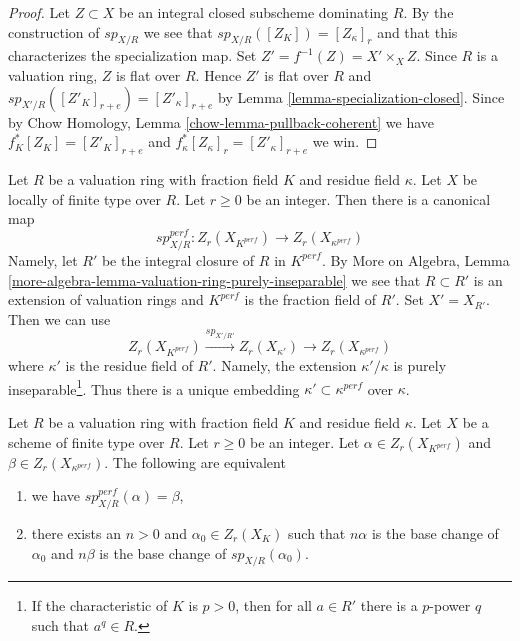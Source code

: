 \begin{proof}
Let $Z \subset X$ be an integral closed subscheme dominating $R$.
By the construction of $sp_{X/R}$ we see that $sp_{X/R}([Z_K]) = [Z_\kappa]_r$
and that this characterizes the specialization map.
Set $Z' = f^{-1}(Z) = X' \times_X Z$.
Since $R$ is a valuation ring, $Z$ is flat over $R$.
Hence $Z'$ is flat over $R$ and
$sp_{X'/R}([Z'_K]_{r + e}) = [Z'_\kappa]_{r + e}$
by Lemma \ref{lemma-specialization-closed}.
Since by Chow Homology, Lemma \ref{chow-lemma-pullback-coherent}
we have $f_K^*[Z_K] = [Z'_K]_{r + e}$ and
$f_\kappa^*[Z_\kappa]_r = [Z'_\kappa]_{r + e}$ we win.
\end{proof}

\begin{remark}
\label{remark-specialization-perfect}
Let $R$ be a valuation ring with fraction field $K$ and residue field $\kappa$.
Let $X$ be locally of finite type over $R$. Let $r \geq 0$ be an integer.
Then there is a canonical map
$$
sp_{X/R}^{perf} :
Z_r(X_{K^{perf}})
\longrightarrow
Z_r(X_{\kappa^{perf}})
$$
Namely, let $R'$ be the integral closure of $R$ in $K^{perf}$.
By More on Algebra, Lemma
\ref{more-algebra-lemma-valuation-ring-purely-inseparable}
we see that $R \subset R'$ is an extension of valuation rings and
$K^{perf}$ is the fraction field of $R'$. Set $X' = X_{R'}$.
Then we can use
$$
Z_r(X_{K^{perf}})
\xrightarrow{sp_{X'/R'}}
Z_r(X_{\kappa'})
\to
Z_r(X_{\kappa^{perf}})
$$
where $\kappa'$ is the residue field of $R'$.
Namely, the extension $\kappa'/\kappa$
is purely inseparable\footnote{If the characteristic
of $K$ is $p > 0$, then for all $a \in R'$ there is
a $p$-power $q$ such that $a^q \in R$.}. Thus there is a unique
embedding $\kappa' \subset \kappa^{perf}$ over $\kappa$.
\end{remark}

\begin{lemma}
\label{lemma-specialization-perfect}
Let $R$ be a valuation ring with fraction field $K$ and residue field $\kappa$.
Let $X$ be a scheme of finite type over $R$. Let $r \geq 0$ be an integer.
Let $\alpha \in Z_r(X_{K^{perf}})$ and $\beta \in Z_r(X_{\kappa^{perf}})$.
The following are equivalent
\begin{enumerate}
\item we have $sp_{X/R}^{perf}(\alpha) = \beta$,
\item there exists an $n > 0$ and $\alpha_0 \in Z_r(X_K)$
such that $n \alpha$ is the base change of $\alpha_0$
and $n \beta$ is the base change of $sp_{X/R}(\alpha_0)$.
\end{enumerate}
\end{lemma}

